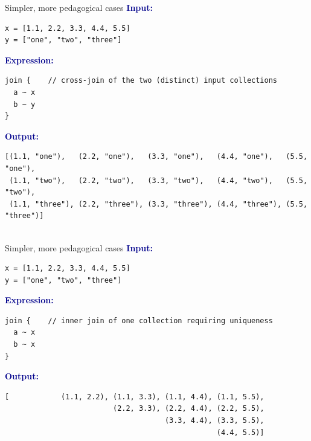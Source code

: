 \documentclass[aspectratio=169]{beamer}
\begin{document}
\begin{frame}[fragile]{Simpler, more pedagogical cases}
\vspace{0.25 cm}
\textcolor{darkblue}{\large\bf Input:}

\begin{verbatim}
x = [1.1, 2.2, 3.3, 4.4, 5.5]
y = ["one", "two", "three"]
\end{verbatim}

\vspace{0.25 cm}
\textcolor{darkblue}{\large\bf Expression:}

\begin{verbatim}
join {    // cross-join of the two (distinct) input collections
  a ~ x
  b ~ y
}
\end{verbatim}

\vspace{0.25 cm}
\textcolor{darkblue}{\large\bf Output:}

\begin{verbatim}
[(1.1, "one"),   (2.2, "one"),   (3.3, "one"),   (4.4, "one"),   (5.5, "one"),
 (1.1, "two"),   (2.2, "two"),   (3.3, "two"),   (4.4, "two"),   (5.5, "two"),
 (1.1, "three"), (2.2, "three"), (3.3, "three"), (4.4, "three"), (5.5, "three")]


\end{verbatim}
\end{frame}

\begin{frame}[fragile]{Simpler, more pedagogical cases}
\vspace{0.25 cm}
\textcolor{darkblue}{\large\bf Input:}

\begin{verbatim}
x = [1.1, 2.2, 3.3, 4.4, 5.5]
y = ["one", "two", "three"]
\end{verbatim}

\vspace{0.25 cm}
\textcolor{darkblue}{\large\bf Expression:}

\begin{verbatim}
join {    // inner join of one collection requiring uniqueness
  a ~ x
  b ~ x
}
\end{verbatim}

\vspace{0.25 cm}
\textcolor{darkblue}{\large\bf Output:}

\begin{verbatim}
[            (1.1, 2.2), (1.1, 3.3), (1.1, 4.4), (1.1, 5.5),
                         (2.2, 3.3), (2.2, 4.4), (2.2, 5.5),
                                     (3.3, 4.4), (3.3, 5.5),
                                                 (4.4, 5.5)]

\end{verbatim}
\end{frame}
\end{document}
